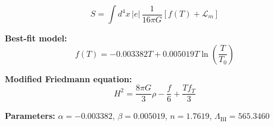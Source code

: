
\begin{equation}
  S = \int d^4x \, |e| \, \frac{1}{16\pi G} \left[ f(T) + \mathcal{L}_m \right]
\end{equation}

\textbf{Best-fit model:}
\begin{equation}
  f(T) = -0.003382 T + 0.005019 T \ln\!\left(\frac{T}{T_0}\right)
\end{equation}

\textbf{Modified Friedmann equation:}
\begin{equation}
  H^2 = \frac{8\pi G}{3} \rho - \frac{f}{6} + \frac{T f_T}{3}
\end{equation}

\textbf{Parameters:}
$\alpha = -0.003382$, \quad
$\beta = 0.005019$, \quad
$n = 1.7619$, \quad
$\Lambda_{\text{BI}} = 565.3460$